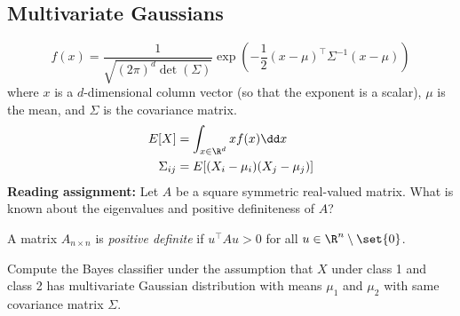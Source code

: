\subsection{Multivariate Gaussians} \label{sec:multivariate_gaussians}
\[
    f(x) = \frac{1}{\sqrt{(2\pi)^d \det(\Sigma)}}
    \exp\left(-\frac{1}{2} (x - \mu)^\top \Sigma^{-1} (x - \mu)\right)
\] where $x$ is a $d$-dimensional column vector (so that the exponent is a
scalar), $\mu$ is the mean, and $\Sigma$ is the covariance matrix.
\begin{align*}
    E[X] &= \int_{x \in \R^d} x f(x) \dd x \\
    \Sigma_{ij} &= E[(X_i - \mu_i)(X_j - \mu_j)]
\end{align*}
\textbf{Reading assignment:} Let $A$ be a square symmetric real-valued matrix.
What is known about the eigenvalues and positive definiteness of $A$?

\begin{definition} \label{def:multivariate_gaussians:positive_definite}
    A matrix $A_{n \times n}$ is \emph{positive definite} if $u^\top A u > 0$
    for all $u \in \R^n \setminus \set{0}$.
\end{definition}

\begin{exercise}
    Compute the Bayes classifier under the assumption that $X$ under class 1
    and class 2 has multivariate Gaussian distribution with means $\mu_1$
    and $\mu_2$ with same covariance matrix $\Sigma$.
\end{exercise}
